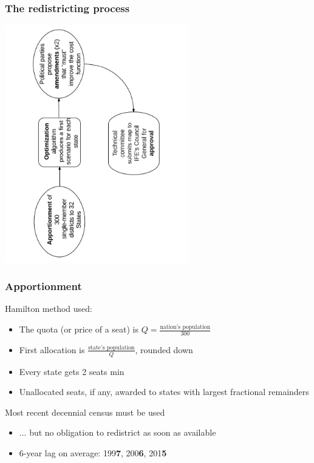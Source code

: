 \documentclass[xcolor=dvipsnames]{beamer}  %
\begin{document}
\begin{frame}                      %
    \frametitle{The redistricting process}
\begin{center}
   \includegraphics[width=8cm, angle=-90]{../../graphs/mexRedisProcessFlowchart.pdf}
\end{center}

\end{frame}
\begin{frame}                      %
    \frametitle{Apportionment}


Hamilton method used:

\begin{itemize}
\item The quota (or price of a seat) is $Q = \frac{\text{nation's population}}{300}$

\item First allocation is $\frac{\text{state's population}}{Q}$, rounded down

\item Every state gets 2 seats min

\item Unallocated seats, if any, awarded to states with largest fractional remainders
\end{itemize}

\bigskip


Most recent decennial census must be used 

\begin{itemize}
\item ... but no obligation to redistrict as soon as available
\item 6-year lag on average: 199\textbf{7}, 200\textbf{6}, 201\textbf{5}
\end{itemize}

\end{frame}
\end{document}
